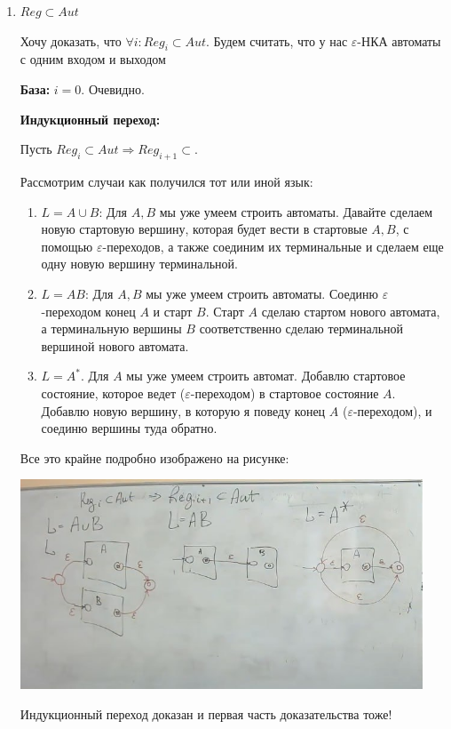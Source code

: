 \begin{enumerate}
    \item $Reg \subset Aut$

    Хочу доказать, что $\forall i: Reg_i \subset Aut$. Будем считать, что у нас $\varepsilon$-НКА автоматы с одним входом и выходом

    \textbf{База:} $i=0$. Очевидно.

    \textbf{Индукционный переход:}

    Пусть $Reg_i \subset Aut \Rightarrow Reg_{i+1}\subset$.

    Рассмотрим случаи как получился тот или иной язык:
    \begin{enumerate}
        \item $L = A \cup B$: Для $A,B$ мы уже умеем строить автоматы. Давайте сделаем новую стартовую вершину, которая будет вести в стартовые $A,B$, с помощью $\varepsilon$-переходов, а также соединим их терминальные и сделаем еще одну новую вершину терминальной.
        \item $L=AB$: Для $A,B$ мы уже умеем строить автоматы. Соединю $\varepsilon$-переходом конец $A$ и старт $B$. Старт $A$ сделаю стартом нового автомата, а терминальную вершины $B$ соответственно сделаю терминальной вершиной нового автомата.
        \item $L = A^*$. Для $A$ мы уже умеем строить автомат. Добавлю стартовое состояние, которое ведет ($\varepsilon$-переходом) в стартовое состояние $A$. Добавлю новую вершину, в которую я поведу конец $A$ ($\varepsilon$-переходом), и соединю вершины туда обратно.
    \end{enumerate}    
    Все это крайне подробно изображено на рисунке:
    \begin{center}
    \includegraphics[width = 12cm]{assets/8_2_1.jpg}
\end{center}
    Индукционный переход доказан и первая часть доказательства тоже!

    
\end{enumerate}
